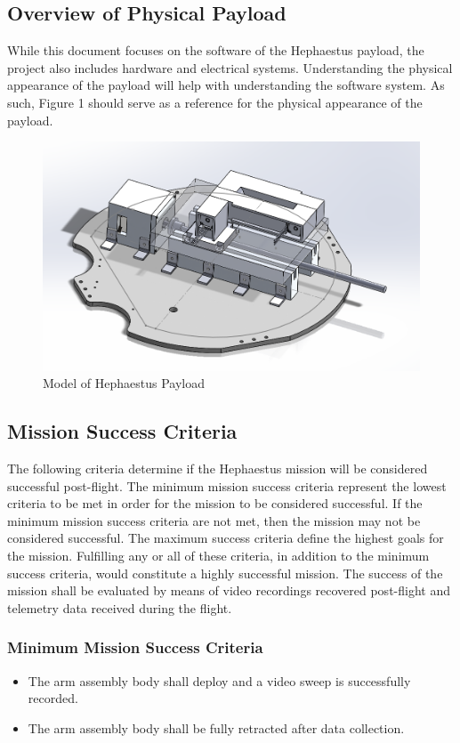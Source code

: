 \documentclass[letterpaper,10pt]{article}
\begin{document}
\subsection{Overview of Physical Payload}
While this document focuses on the software of the Hephaestus payload, the project also includes hardware
 and electrical systems. 
Understanding the physical appearance of the payload will help with understanding the software system. 
As such, Figure 1 should serve as a reference for the physical appearance of the payload.
\begin{figure}
\includegraphics[scale=.5]{img2}
\caption{Model of Hephaestus Payload}
\end{figure}

\subsection{Mission Success Criteria}
The following criteria determine if the Hephaestus mission will be considered successful post-flight.
The minimum mission success criteria represent the lowest criteria to be met in order for the mission to be considered successful.
If the minimum mission success criteria are not met, then the mission may not be considered successful.
The maximum success criteria define the highest goals for the mission.
Fulfilling any or all of these criteria, in addition to the minimum success criteria, would constitute a highly successful mission.
The success of the mission shall be evaluated by means of video recordings recovered post-flight and telemetry data received during the flight.

\subsubsection{Minimum Mission Success Criteria}
\begin{itemize}
\item{The arm assembly body shall deploy and a video sweep is successfully recorded.}
\item{The arm assembly body shall be fully retracted after data collection.}
\end{itemize}
\end{document}
